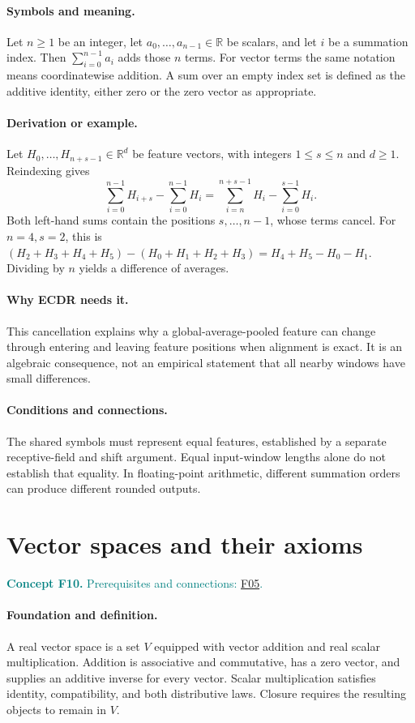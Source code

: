\documentclass[11pt,a4paper]{article}
\newcommand{\R}{\mathbb R}
\newcommand{\conceptid}{Front matter}
\newcommand{\concept}[3]{\clearpage\renewcommand{\conceptid}{#1}%
\section{#2}\label{concept:#1}%
\textcolor{teal}{\textbf{Concept #1.} Prerequisites and connections: #3.}\par
\typeout{ECDR-CONCEPT-START #1 PAGE=\thepage}}
\begin{document}
\paragraph{Symbols and meaning.}
Let $n\ge1$ be an integer, let $a_0,\ldots,a_{n-1}\in\R$ be scalars,
and let $i$ be a summation index. Then $\sum_{i=0}^{n-1}a_i$ adds those
$n$ terms. For vector terms the same notation means coordinatewise
addition. A sum over an empty index set is defined as the additive
identity, either zero or the zero vector as appropriate.
\paragraph{Derivation or example.}
Let $H_0,\ldots,H_{n+s-1}\in\R^d$ be feature vectors, with integers
$1\le s\le n$ and $d\ge1$. Reindexing gives
\[
 \sum_{i=0}^{n-1}H_{i+s}-\sum_{i=0}^{n-1}H_i
 =\sum_{i=n}^{n+s-1}H_i-\sum_{i=0}^{s-1}H_i.
\]
Both left-hand sums contain the positions $s,\ldots,n-1$, whose terms
cancel. For $n=4,s=2$, this is
$(H_2+H_3+H_4+H_5)-(H_0+H_1+H_2+H_3)
=H_4+H_5-H_0-H_1$. Dividing by $n$ yields a difference of averages.
\paragraph{Why ECDR needs it.}
This cancellation explains why a global-average-pooled feature can change
through entering and leaving feature positions when alignment is exact.
It is an algebraic consequence, not an empirical statement that all
nearby windows have small differences.
\paragraph{Conditions and connections.}
The shared symbols must represent equal features, established by a
separate receptive-field and shift argument. Equal input-window lengths
alone do not establish that equality. In floating-point arithmetic,
different summation orders can produce different rounded outputs.
\par\label{endconcept:F09}

\concept{F10}{Vector spaces and their axioms}{\hyperref[concept:F05]{F05}}
\paragraph{Foundation and definition.}
A real vector space is a set $V$ equipped with vector addition and real
scalar multiplication. Addition is associative and commutative, has a
zero vector, and supplies an additive inverse for every vector. Scalar
multiplication satisfies identity, compatibility, and both distributive
laws. Closure requires the resulting objects to remain in $V$.
\end{document}
